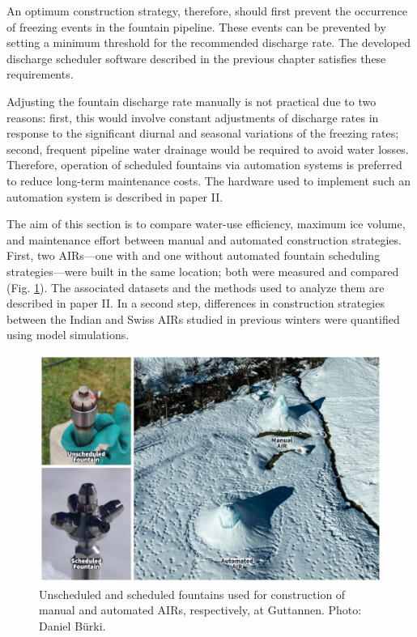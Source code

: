 An optimum construction strategy, therefore, should first prevent the occurrence of freezing events in the
fountain pipeline. These events can be prevented by setting a minimum threshold for the recommended discharge
rate. The developed discharge scheduler software described in the previous chapter satisfies these requirements.

Adjusting the fountain discharge rate manually is not practical due to two reasons: first, this would involve
constant adjustments of discharge rates in response to the significant diurnal and seasonal variations of the
freezing rates; second, frequent pipeline water drainage would be required to avoid water losses. Therefore, operation
of scheduled fountains via automation systems is preferred to reduce long-term maintenance costs. The
hardware used to implement such an automation system is described in paper II.

The aim of this section is to compare water-use efficiency, maximum ice volume, and maintenance effort between
manual and automated construction strategies. First, two AIRs---one with and one
without automated fountain scheduling strategies---were built in the same location; both were measured and compared (Fig. \ref{fig:autovsman}).
The associated datasets and the methods used to analyze them are described in paper II. In a second step,
differences in construction strategies between the Indian and Swiss AIRs studied in previous winters were quantified
using model simulations. 

\begin{figure}[htb]
	\includegraphics[width=\textwidth]{figs/AIR_fountains.jpg}
	\caption{Unscheduled and scheduled fountains used for construction of manual and automated AIRs, respectively, at
		Guttannen. Photo: Daniel Bürki.}
	\label{fig:autovsman}
\end{figure}


